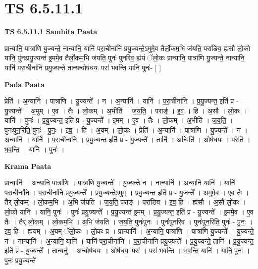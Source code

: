 \documentclass[17pt]{extarticle}
\begin{document}
\section{ TS 6.5.11.1 }

\textbf{TS 6.5.11.1 } \newline
\textbf{Samhita Paata} \newline

प्रान्यानि॒ पात्रा॑णि यु॒ज्यन्ते॒ नान्यानि॒ यानि॑ परा॒चीना॑नि प्रयु॒ज्यन्ते॒ऽमुमे॒व तैर्लो॒कम॒भि ज॑यति॒ परा॑ङिव॒ ह्य॑सौ लो॒को यानि॒ पु॑नःप्रयु॒ज्यन्त॑ इ॒ममे॒व तैर्लो॒कम॒भि ज॑यति॒ पुनः॑ पुनरिव॒ ह्य॑यं ॅलो॒कः प्रान्यानि॒ पात्रा॑णि यु॒ज्यन्ते॒ नान्यानि॒ यानि॑ परा॒चीना॑नि प्रयु॒ज्यन्ते॒ तान्यन्वोष॑धयः॒ परा॑ भवन्ति॒ यानि॒ पुनः॑- [  ] \newline

\textbf{Pada Paata} \newline

प्रेति॑ । अ॒न्यानि॑ । पात्रा॑णि । यु॒ज्यन्ते᳚ । न । अ॒न्यानि॑ । यानि॑ । प॒रा॒चीना॑नि । प्र॒यु॒ज्यन्त॒ इति॑ प्र - यु॒ज्यन्ते᳚ । अ॒मुम् । ए॒व । तैः । लो॒कम् । अ॒भीति॑ । ज॒य॒ति॒ । पराङ्॑ । इ॒व॒ । हि । अ॒सौ । लो॒कः । यानि॑ । पुनः॑ । प्र॒यु॒ज्यन्त॒ इति॑ प्र - यु॒ज्यन्ते᳚ । इ॒मम् । ए॒व । तैः । लो॒कम् । अ॒भीति॑ । ज॒य॒ति॒ । पुनः॑पुन॒रिति॒ पुनः॑ - पु॒नः॒ । इ॒व॒ । हि । अ॒यम् । लो॒कः । प्रेति॑ । अ॒न्यानि॑ । पात्रा॑णि । यु॒ज्यन्ते᳚ । न । अ॒न्यानि॑ । यानि॑ । प॒रा॒चीना॑नि । प्र॒यु॒ज्यन्त॒ इति॑ प्र - यु॒ज्यन्ते᳚ । तानि॑ । अन्विति॑ । ओष॑धयः । परेति॑ । भ॒व॒न्ति॒ । यानि॑ । पुनः॑ ।  \newline


\textbf{Krama Paata} \newline

प्रान्यानि॑ । अ॒न्यानि॒ पात्रा॑णि । पात्रा॑णि यु॒ज्यन्ते᳚ । यु॒ज्यन्ते॒ न । नान्यानि॑ । अ॒न्यानि॒ यानि॑ । यानि॑ परा॒चीना॑नि । प॒रा॒चीना॑नि प्रयु॒ज्यन्ते᳚ । प्र॒यु॒ज्यन्ते॒ऽमुम् । प्र॒यु॒ज्यन्त॒ इति॑ प्र - यु॒जन्ते᳚ । अ॒मुमे॒व । ए॒व तैः । तैर् लो॒कम् । लो॒कम॒भि । अ॒भि ज॑यति । ज॒य॒ति॒ पराङ्॑ । परा॑ङिव । इ॒व॒ हि । ह्य॑सौ । अ॒सौ लो॒कः । लो॒को यानि॑ । यानि॒ पुनः॑ । पुनः॑ प्रयु॒ज्यन्ते᳚ । प्र॒यु॒ज्यन्त॑ इ॒मम् । प्र॒यु॒ज्यन्त॒ इति॑ प्र - यु॒ज्यन्ते᳚ । इ॒ममे॒व । ए॒व तैः । तैर् लो॒कम् । लो॒कम॒भि । अ॒भि ज॑यति । ज॒य॒ति॒ पुनः॑पुनः । पुनः॑पुनरिव । पुनः॑पुन॒रिति॒ पुनः॑ - पु॒नः॒ । इ॒व॒ हि । ह्य॑यम् । अ॒यम् ॅलो॒कः । लो॒कः प्र । प्रान्यानि॑ । अ॒न्यानि॒ पात्रा॑णि । पात्रा॑णि यु॒ज्यन्ते᳚ । यु॒ज्यन्ते॒ न । नान्यानि॑ । अ॒न्यानि॒ यानि॑ । यानि॑ परा॒चीना॑नि । प॒रा॒चीना॑नि प्रयु॒ज्यन्ते᳚ । प्र॒यु॒ज्यन्ते॒ तानि॑ । प्र॒यु॒ज्यन्त॒ इति॑ प्र - यु॒ज्यन्ते᳚ । तान्यनु॑ । अन्वोष॑धयः । ओष॑धयः॒ परा᳚ । परा॑ भवन्ति । भ॒व॒न्ति॒ यानि॑ । यानि॒ पुनः॑ । पुनः॑ प्रयु॒ज्यन्ते᳚ \newline
\end{document}
